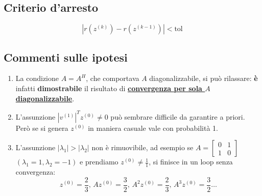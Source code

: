 \documentclass[12pt,a4paper,]{report}
\begin{document}
\subsection{Criterio d'arresto}
\begin{definizione}
    \[|r(z^{(k)}) - r(z^{(k-1)})| < \text{tol}\]
\end{definizione}

\subsection{Commenti sulle ipotesi}
\label{sec: ipotesi metodo potenze}
\begin{enumerate}
    \item La condizione $A=A^H$, che comportava $A$ diagonalizzabile, si può rilassare: \textbf{è} infatti \textbf{dimostrabile} il risultato di \uline{\textbf{convergenza per sola $A$ diagonalizzabile}}.
    \item L'assunzione $|v^{(1)}|^T z^{(0)} \neq 0$ può sembrare difficile da garantire a priori. Però se si genera $z^{(0)}$ in maniera casuale vale con probabilità 1.
    \item L'assunzione $|\lambda_1| > |\lambda_2|$ non è rimuovibile, ad esempio se $A = \begin{bmatrix} 0 & 1 \\ 1 & 0 \end{bmatrix}$ $(\lambda_1 = 1, \lambda_2 = -1)$ e prendiamo $z^{(0)} \neq \frac{1}{1}$, si finisce in un loop senza convergenza:
    \[
    z^{(0)} = \frac{2}{3}, \, Az^{(0)} = \frac{3}{2}, \, A^2 z^{(0)} = \frac{2}{3}, \, A^3 z^{(0)} = \frac{3}{2} \ldots
    \]
\end{enumerate}
\end{document}
